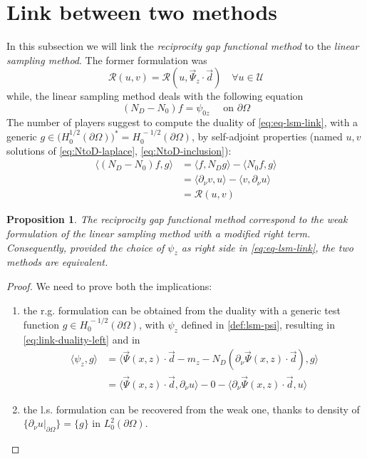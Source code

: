\documentclass[10pt, a4paper, twoside, openright]{book}
\theoremstyle{definition}
\theoremstyle{plain}
\theoremstyle{plain}
\theoremstyle{plain}
\newtheorem{proposition}[subsection]{Proposition}
\theoremstyle{plain}
\theoremstyle{plain}
\theoremstyle{plain}
\theoremstyle{plain}
\theoremstyle{plain}
\begin{document}
\section{Link between two methods}
In this subsection we will link the \textit{reciprocity gap functional method} to the \emph{linear sampling method}.
The former formulation was
\begin{equation}
 \mathcal{R}(u, v) = \mathcal{R}(u, \vec{\Psi}_z\cdot\vec{d})\quad \forall u \in \mathcal{U}
\end{equation}
while, the linear sampling method deals with the following equation
\begin{equation}
\label{eq:eq-lsm-link}
 ({N_D} - {N_0})f = \psi_{0z} \quad \text{ on }\partial \Omega
\end{equation}
The number of players suggest to compute the duality of \eqref{eq:eq-lsm-link}, with a generic 
${g \in \bigl(H^{1/2}_0(\partial \Omega)\bigr)^* = H^{\,-1/2}_0(\partial \Omega)}$, by self-adjoint properties (named $u,v$ solutions of \eqref{eq:NtoD-laplace}, \eqref{eq:NtoD-inclusion}):
\begin{align}
 \label{eq:link-duality-left}
 \langle({N_D} - {N_0})f,g\rangle & =  \langle f,{N_D} g\rangle - \langle {N_0} f,g\rangle \\
                                        & = \langle \partial_\nu v,u\rangle - \langle v,\partial_\nu u\rangle \\
                                        & = \mathcal{R}(u,v)
\end{align}
\begin{proposition}
 The \textit{reciprocity gap functional method} correspond to the weak formulation of the \textit{linear sampling method} with a modified right term. Consequently, provided the choice of $\psi_z$ as right side in \eqref{eq:eq-lsm-link}, the two methods are equivalent.
\end{proposition}
\begin{proof}
 We need to prove both the implications:
\begin{enumerate}
 \item the r.g. formulation can be obtained from the duality with a generic test function $g\in H^{\, -1/2}_0(\partial \Omega)$, with $\psi_z$ defined in \ref{def:lsm-psi}, resulting in \eqref{eq:link-duality-left} and in
\begin{align}
 \langle \psi_z , g \rangle  & = \langle \vec{\Psi}(x,z)\cdot\vec{d} - m_z - {N_D}(\partial_\nu \vec{\Psi}(x,z) \cdot \vec{d}) , g \rangle \\
                             & = \langle \vec{\Psi}(x,z)\cdot\vec{d},\partial_\nu u\rangle - 0 - \langle\partial_\nu \vec{\Psi}(x,z) \cdot \vec{d},u\rangle
\end{align}
 \item the l.s. formulation can be recovered from the weak one, thanks to density of $\{\partial_\nu u|_{\partial \Omega}\}=\{g\}$ in $L_0^2(\partial \Omega)$.
\end{enumerate}
\end{proof}
\end{document}
